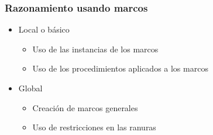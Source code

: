 \documentclass[
10pt, %
aspectratio=169, %
]{beamer}
\begin{document}
	\begin{frame}
		
		\frametitle{Razonamiento usando marcos}
		
		
		\begin{itemize}
			\item Local o básico
			\begin{itemize}
				\item Uso de las instancias de los marcos 
				\item Uso de los procedimientos aplicados a los marcos
			\end{itemize}
			
			\vspace{1\baselineskip}
			\item Global
			\begin{itemize}
				\item Creación de marcos generales 
				\item Uso de restricciones en las ranuras
			\end{itemize}
			
		\end{itemize}
		
	\end{frame}
	
\end{document}
